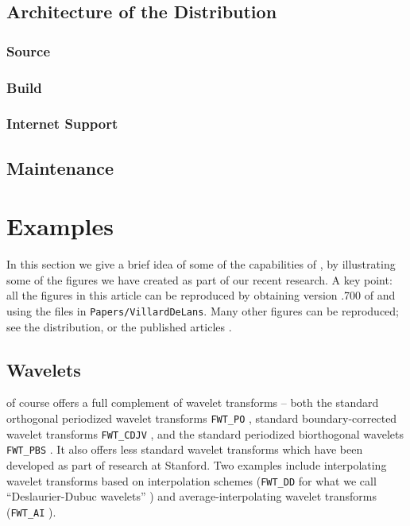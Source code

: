 \subsection{Architecture of the Distribution}

\subsubsection{Source}

\subsubsection{Build}

\subsubsection{Internet Support}

\subsection{Maintenance}

\section{Examples}

In this section we give a brief idea of some of the capabilities
of \WaveLab, by illustrating some of the figures we have
created as part of our recent research.  
A key point: all the figures in this
article can be reproduced by obtaining version .700 of \WaveLab
and using the files in {\tt Papers/VillardDeLans}.
Many other figures can be reproduced; see the \WaveLab
distribution, or the published articles 
\cite{IdealSpatial,Asymptopia,ShortCourse,Blocky,Toulouse}.

\subsection{Wavelets}

\WaveLab of course offers a full complement of
wavelet transforms -- both the standard orthogonal
periodized wavelet transforms {\tt FWT\_PO} \cite{Daubechies}, standard boundary-corrected
wavelet transforms {\tt FWT\_CDJV} \cite{CDJV}, and the
standard periodized biorthogonal wavelets
{\tt FWT\_PBS} \cite{CDF}.  It also offers less standard wavelet transforms
which have been developed as part of research
at Stanford.  Two examples include interpolating
wavelet transforms based on interpolation schemes
({\tt FWT\_DD} for what we call ``Deslaurier-Dubuc
wavelets'' \cite{Interpolating}) and average-interpolating wavelet transforms
({\tt FWT\_AI} \cite{Blocky}). 

